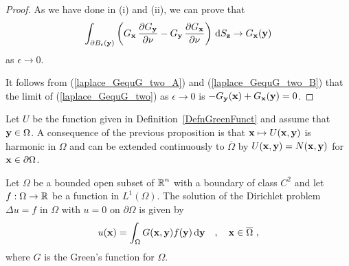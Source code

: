 \begin{proof}
As we have done in (i) and (ii), we can prove that
\begin{equation} \label{laplace_GequG_two_B}
\int_{\partial B_{\epsilon}(\mathbf{y})}
\left( G_{\mathbf{x}}\,\frac{\partial{G_{\mathbf{y}}}}{\partial \mathbf{\nu}} 
- G_{\mathbf{y}}\,\frac{\partial{G_{\mathbf{x}}}}{\partial \mathbf{\nu}} \right) \,\mathrm{d}{S}_{\mathbf{z}}
\to G_{\mathbf{x}}(\mathbf{y})
\end{equation}
as $\epsilon \to 0$.

It follows from (\ref{laplace_GequG_two_A}) and
(\ref{laplace_GequG_two_B}) that the limit of
(\ref{laplace_GequG_two}) as $\epsilon \to 0$ is
$-G_{\mathbf{y}}(\mathbf{x}) + G_{\mathbf{x}}(\mathbf{y}) = 0$.
\end{proof}

Let $U$ be the function given in Definition~\ref{DefnGreenFunct} and
assume that $\mathbf{y} \in \Omega$.  A consequence of the previous
proposition is that $\mathbf{x} \mapsto U(\mathbf{x},\mathbf{y})$ is harmonic
in $\Omega$ and can be extended continuously to $\overline{\Omega}$ by
$U(\mathbf{x},\mathbf{y}) = N(\mathbf{x},\mathbf{y})$ for
$\mathbf{x} \in \partial \Omega$.

\begin{theorem} \label{laplace_dirichlet1}
Let $\Omega$ be a bounded open subset of $\displaystyle \mathbb{R}^n$ with a
boundary of class $\displaystyle C^2$ and let
$f:\Omega \rightarrow \mathbb{R}$ be a function in
$\displaystyle L^1(\Omega)$.  The solution of the Dirichlet problem
$\Delta u = f$ in $\Omega$ with $u=0$ on $\partial \Omega$ is given by
\[
u(\mathbf{x}) = \int_{\Omega} G(\mathbf{x},\mathbf{y})f(\mathbf{y}) \,\mathrm{d}{\mathbf{y}}
\quad , \quad \mathbf{x} \in \overline{\Omega} \ ,
\]
where $G$ is the Green's function for $\Omega$.
\end{theorem}

